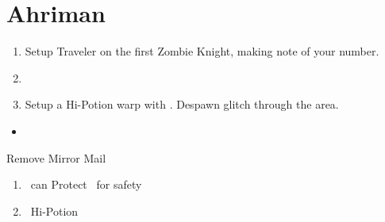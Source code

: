\chapter{Ahriman}
\begin{menu}
\party{\vaan}
\end{menu}
\begin{enumerate}
	\item Setup Traveler on the first Zombie Knight, making note of your number.
	\item {}
	\item Setup a Hi-Potion warp with \basch. Despawn glitch through the area.
\end{enumerate}
\begin{menu}
\party{\vaan, \balthier, \ashe}
\begin{itemize}\item \leader{\balthier}\end{itemize}
\end{menu}
\begin{equip}
\begin{itemize}
\vaanf Remove Mirror Mail
\end{itemize}
\end{equip}
\begin{liscense}
	\begin{itemize}
	\end{itemize}
\end{liscense}
\begin{enumerate}[resume]
	\decoy{\ashe}{\vaan}
	\item \balthier\ can Protect \vaan\ for safety
	\item \vaan\ Hi-Potion
\end{enumerate}
